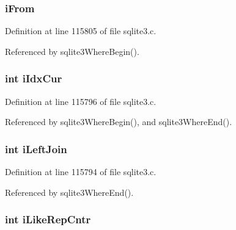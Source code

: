 \hypertarget{struct_where_level_af49ca5d468f3332716f64944ed6f07e9}{}
\subsubsection[{i\+From}]{ i\+From}\label{struct_where_level_af49ca5d468f3332716f64944ed6f07e9}


Definition at line 115805 of file sqlite3.\+c.



Referenced by sqlite3\+Where\+Begin().

\hypertarget{struct_where_level_aecc5f6fc895b5d32e286a8a34ebbec98}{}
\subsubsection[{i\+Idx\+Cur}]{\setlength{\rightskip}{0pt plus 5cm}int i\+Idx\+Cur}\label{struct_where_level_aecc5f6fc895b5d32e286a8a34ebbec98}


Definition at line 115796 of file sqlite3.\+c.



Referenced by sqlite3\+Where\+Begin(), and sqlite3\+Where\+End().

\hypertarget{struct_where_level_a79a899518a34f0fc50ab104412fe1ab1}{}
\subsubsection[{i\+Left\+Join}]{\setlength{\rightskip}{0pt plus 5cm}int i\+Left\+Join}\label{struct_where_level_a79a899518a34f0fc50ab104412fe1ab1}


Definition at line 115794 of file sqlite3.\+c.



Referenced by sqlite3\+Where\+End().

\hypertarget{struct_where_level_a1503c6ce7512eec00b17c99515601372}{}
\subsubsection[{i\+Like\+Rep\+Cntr}]{\setlength{\rightskip}{0pt plus 5cm}int i\+Like\+Rep\+Cntr}\label{struct_where_level_a1503c6ce7512eec00b17c99515601372}


